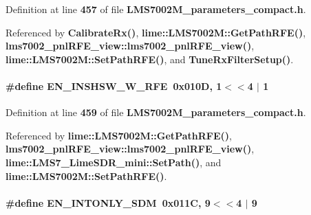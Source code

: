 Definition at line {\bf 457} of file {\bf L\+M\+S7002\+M\+\_\+parameters\+\_\+compact.\+h}.



Referenced by {\bf Calibrate\+Rx()}, {\bf lime\+::\+L\+M\+S7002\+M\+::\+Get\+Path\+R\+F\+E()}, {\bf lms7002\+\_\+pnl\+R\+F\+E\+\_\+view\+::lms7002\+\_\+pnl\+R\+F\+E\+\_\+view()}, {\bf lime\+::\+L\+M\+S7002\+M\+::\+Set\+Path\+R\+F\+E()}, and {\bf Tune\+Rx\+Filter\+Setup()}.

\paragraph[{E\+N\+\_\+\+I\+N\+S\+H\+S\+W\+\_\+\+W\+\_\+\+R\+FE}]{\setlength{\rightskip}{0pt plus 5cm}\#define E\+N\+\_\+\+I\+N\+S\+H\+S\+W\+\_\+\+W\+\_\+\+R\+FE~0x010\+D, 1$<$$<$4 $\vert$  1}\label{LMS7002M__parameters__compact_8h_a43d54a2affc693c661d9ec1848625be0}


Definition at line {\bf 459} of file {\bf L\+M\+S7002\+M\+\_\+parameters\+\_\+compact.\+h}.



Referenced by {\bf lime\+::\+L\+M\+S7002\+M\+::\+Get\+Path\+R\+F\+E()}, {\bf lms7002\+\_\+pnl\+R\+F\+E\+\_\+view\+::lms7002\+\_\+pnl\+R\+F\+E\+\_\+view()}, {\bf lime\+::\+L\+M\+S7\+\_\+\+Lime\+S\+D\+R\+\_\+mini\+::\+Set\+Path()}, and {\bf lime\+::\+L\+M\+S7002\+M\+::\+Set\+Path\+R\+F\+E()}.

\paragraph[{E\+N\+\_\+\+I\+N\+T\+O\+N\+L\+Y\+\_\+\+S\+DM}]{\setlength{\rightskip}{0pt plus 5cm}\#define E\+N\+\_\+\+I\+N\+T\+O\+N\+L\+Y\+\_\+\+S\+DM~0x011\+C, 9$<$$<$4 $\vert$  9}\label{LMS7002M__parameters__compact_8h_a14905ec1f5fe6b5965111d015ed416ff}


